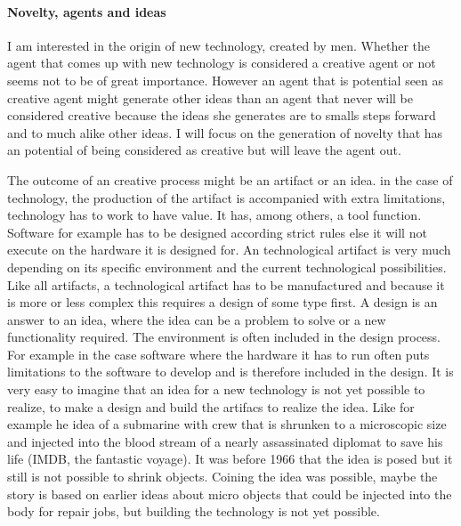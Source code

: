 \documentclass[a4paper]{Thesis}
\begin{document}
\paragraph{Novelty, agents and ideas}
I am interested in the origin of new technology, created by men. Whether the agent that comes up with new technology is considered a creative agent or not seems not to be of great importance. However an agent that is potential seen as creative agent might generate other ideas than an agent that never will be considered creative because the ideas she generates are to smalls steps forward and to much alike other ideas. I will focus on the generation of novelty that has an potential of being considered as creative but will leave the agent out.

The outcome of an creative process might be an artifact or an idea. in the case of technology, the production of the artifact is accompanied with extra limitations,  technology has to work to have value.
 It has, among others, a tool function. 
Software for example has to be designed according strict rules else it will not execute on the hardware it is designed for. An technological artifact is very much depending on its specific environment and the current technological possibilities. 
Like all artifacts, a technological artifact has to be manufactured and because it is more or less complex this requires a design of some type first.
A design is an answer to an idea, where the idea can be a problem to solve or a new functionality required.
The environment is often included in the design process. For example in the case software where the hardware it has to run often puts limitations to the software to develop and is therefore included in the design.
It is very easy to imagine that an idea for a new technology is not yet possible to realize, to make a design and build the artifacs to realize the idea. 
Like for example he idea of a submarine with crew that is shrunken to a microscopic size and injected into the blood stream of a nearly assassinated diplomat to save his life (IMDB, the fantastic voyage). It was before 1966 that the idea is posed but it still is not possible to shrink objects. 
Coining the idea was possible, maybe the story is based on earlier ideas about micro objects that could be injected into the body for repair jobs,  but building the technology is not yet possible. 
\end{document}
